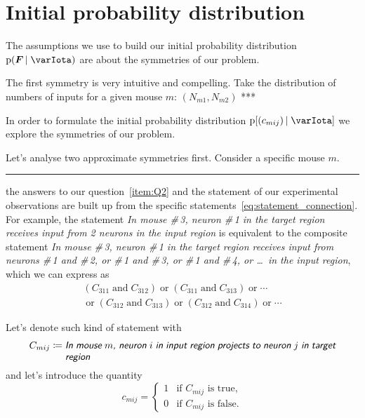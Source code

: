 \documentclass[\ifafour a4paper,12pt,\else a5paper,10pt,\fi%
onecolumn,oneside,article,%
british%
]{memoir}
\theoremstyle{remark}
\theoremstyle{innote}
\newcommand*{\defd}{\coloneqq}
\newcommand*{\pf}{\mathrm{p}}%
\renewcommand*{\|}[1][]{\nonscript\,#1\vert\nonscript\;\mathopen{}}
\newcommand*{\yI}{\varIota}
\newcommand*{\yC}{C}
\newcommand*{\yc}{c}
\newcommand*{\statm}[1]{\textsl{\textsf{#1}}}
\newcommand*{\yN}{N}
\newcommand*{\yF}{\bm{F}}
\begin{document}
\section{Initial probability distribution}
\label{sec:init_prob}

The assumptions we use to build our initial probability distribution
$\pf(\yF \| \yI)$ are about the symmetries of our problem.

The first symmetry is very intuitive and compelling. Take the distribution
of numbers of inputs for a given mouse $m$: $(\yN_{m1}, \yN_{m2})$ ***



In order to formulate the initial probability distribution $\pf[(\yc_{mij})
\| \yI]$ we explore the symmetries of our problem.

Let's analyse two approximate symmetries first. Consider a specific mouse
$m$.




\clearpage
\hrule




the answers to our
question~\ref{item:Q2} and the statement of our experimental observations
are built up from the specific statements~\eqref{eq:statement_connection}.
For example, the statement \statm{In mouse \#\,3, neuron \#\,1 in the
  target region receives input from 2 neurons in the input region} is
equivalent to the composite statement \statm{In mouse \#\,3, neuron \#\,1
  in the target region receives input from neurons \#\,1 and \#\,2, or
  \#\,1 and \#\,3, or \#\,1 and \#\,4, or \ldots\ in the input region},
which we can express as
\begin{multline}
  (\yC_{311} \mathbin{\text{and}} \yC_{312}) \mathbin{\text{or}}
  (\yC_{311} \mathbin{\text{and}} \yC_{313}) \mathbin{\text{or}}
  \dotsb{}\\ {}\mathbin{\text{or}}
  (\yC_{312} \mathbin{\text{and}} \yC_{313}) \mathbin{\text{or}}
  (\yC_{312} \mathbin{\text{and}} \yC_{314}) \mathbin{\text{or}}
  \dotsb{}
\end{multline}





 Let's denote such kind of statement with
\begin{equation}
  \label{eq:statement_connection}
  \yC_{mij} \defd \parbox[t]{0.8\linewidth}{\statm{In mouse $m$, neuron $i$ in input region projects to neuron $j$ in target region}}
\end{equation}
and let's introduce the quantity
\begin{equation}
  \label{eq:quantity_connection}
  \yc_{mij} =
  \begin{cases}
    1&\text{if $\yC_{mij}$ is true},\\
    0&\text{if $\yC_{mij}$ is false}.
  \end{cases}
\end{equation}
\end{document}
